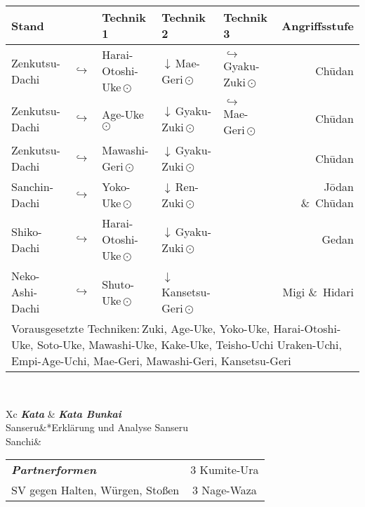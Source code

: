 	\null\vfill\null
	\begin{tabularx}{\textwidth}{llllXr}
		\textbf{Stand} 	&  	& \textbf{Technik 1} & \textbf{Technik 2} 				& \textbf{Technik 3}& \textbf{Angriffsstufe}\\
		\midrule
		Zenkutsu-Dachi 	& \(\hookrightarrow\)	& Harai-Otoshi-Uke\,\(\odot\) 	& \(\downarrow\)\,Mae-Geri\,\(\odot\)	& \(\hookrightarrow\) 	 Gyaku-Zuki\,\(\odot\)	& Ch\={u}dan \\
		Zenkutsu-Dachi 	& \(\hookrightarrow\)	& Age-Uke\,\(\odot\) 			& \(\downarrow\)\,Gyaku-Zuki\,\(\odot\) & \(\hookrightarrow\)	 Mae-Geri\,\(\odot\)	& Ch\={u}dan \\
		Zenkutsu-Dachi 	& \(\hookrightarrow\)	& Mawashi-Geri\,\(\odot\) 		& \(\downarrow\)\,Gyaku-Zuki\,\(\odot\) 				&						&	 					 Ch\={u}dan \\
		Sanchin-Dachi 	& \(\hookrightarrow\)	& Yoko-Uke\,\(\odot\) 			& \(\downarrow\)\,Ren-Zuki\,\(\odot\) 					&						& 						 J\={o}dan \&~Ch\={u}dan \\
		Shiko-Dachi 	& \(\hookrightarrow\)	& Harai-Otoshi-Uke\,\(\odot\) 	& \(\downarrow\)\,Gyaku-Zuki\,\(\odot\) 				&						& 						 Gedan \\
		Neko-Ashi-Dachi	& \(\hookrightarrow\)	& Shuto-Uke\,\(\odot\) 			& \(\downarrow\)\,Kansetsu-Geri\,\(\odot\) 					&						& 						 Migi \&~Hidari  \\
		\midrule
		\multicolumn{6}{p{\linewidth-2\tabcolsep}}{{\footnotesize Vorausgesetzte Techniken:\,Zuki, Age-Uke, Yoko-Uke, Harai-Otoshi-Uke, Soto-Uke, Mawashi-Uke, Kake-Uke, Teisho-Uchi Uraken-Uchi, Empi-Age-Uchi, Mae-Geri, Mawashi-Geri, Kansetsu-Geri}}\\
		\midrule
	\end{tabularx}\\
	\null\vfill\null
	\begin{minipage}[t]{0.45\textwidth}
		\begin{tabularx}{\textwidth}{Xc}
			\midrule
			\textbf{\textit{Kata}} & \textbf{\textit{Kata Bunkai}} \\
			Sanseru&*{Erklärung und Analyse Sanseru}\\
			Sanchi& \\
			\midrule
		\end{tabularx}
	\end{minipage}
	\null\hfill\null
	\begin{minipage}[t]{0.45\textwidth}
		\begin{tabularx}{\textwidth}{Xc}
			\midrule
			{\textbf{\textit{Partnerformen}}} & 3 Kumite-Ura\\
			SV gegen Halten, Würgen, Stoßen & 3 Nage-Waza  \\
			\midrule
		\end{tabularx}
	\end{minipage}\\
